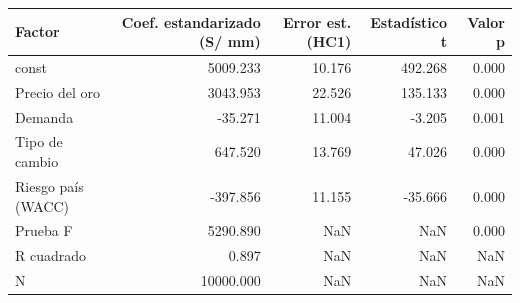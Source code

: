 \begin{tabular}{lrrrr}
\toprule
Factor & Coef. estandarizado (S/ mm) & Error est. (HC1) & Estadístico t & Valor p \\
\midrule
const & 5009.233 & 10.176 & 492.268 & 0.000 \\
Precio del oro & 3043.953 & 22.526 & 135.133 & 0.000 \\
Demanda & -35.271 & 11.004 & -3.205 & 0.001 \\
Tipo de cambio & 647.520 & 13.769 & 47.026 & 0.000 \\
Riesgo país (WACC) & -397.856 & 11.155 & -35.666 & 0.000 \\
Prueba F & 5290.890 & NaN & NaN & 0.000 \\
R cuadrado & 0.897 & NaN & NaN & NaN \\
N & 10000.000 & NaN & NaN & NaN \\
\bottomrule
\end{tabular}
